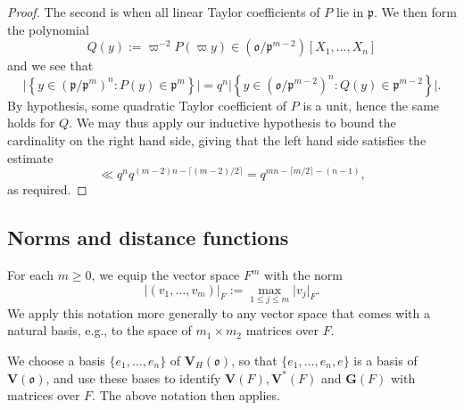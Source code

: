 \documentclass[reqno]{amsart}
\theoremstyle{plain} \newtheorem{theorem} {Theorem} \newtheorem{conjecture} {Conjecture} \newtheorem{corollary} [theorem] {Corollary} \newtheorem{proposition} [theorem] {Proposition} \newtheorem{fact} [theorem] {Fact}
\theoremstyle{definition} \newtheorem{definition} [theorem] {Definition}
\theoremstyle{itplain} %
\begin{document}
\begin{proof}
  The second is when all linear Taylor coefficients of $P$ lie in $\mathfrak{p}$.  We then form the polynomial
  \begin{equation*}
    Q(y) := \varpi^{-2} P(\varpi y) \in (\mathfrak{o} / \mathfrak{p}^{m-2})[X_1,\dotsc,X_n]
  \end{equation*}
  and we see that
  \begin{equation*}
    \lvert \left\{ y \in {(\mathfrak{p}/\mathfrak{p}^m)}^n : P(y) \in \mathfrak{p}^m \right\} \rvert
    =
    q^n \lvert \left\{ y \in {(\mathfrak{o}/\mathfrak{p}^{m-2})}^n : Q(y) \in \mathfrak{p}^{m-2} \right\} \rvert.
  \end{equation*}
  By hypothesis, some quadratic Taylor coefficient of $P$ is a unit, hence the same holds for $Q$.  We may thus apply our inductive hypothesis to bound the cardinality on the right hand side, giving that the left hand side satisfies the estimate
  \begin{equation*}
    \ll q^n q ^{(m- 2) n - \lceil (m-2)/2 \rceil}
    =
    q ^{m n - \lceil m/2 \rceil - (n-1)},
  \end{equation*}
  as required.
\end{proof}


\subsection{Norms and distance functions}\label{sec:norms-distance-functions}
For each $m \geq 0$, we equip the vector space $F^m$ with the norm
\begin{equation*}
  \left\lvert  (v_1,\dotsc,v_m)  \right\rvert_F := \max_{1 \leq j \leq m} \lvert v _j  \rvert_F.
\end{equation*}
We apply this notation more generally to any vector space that comes with a natural basis, e.g., to the space of $m_1 \times m_2$ matrices over $F$.


We choose a basis $\{e_1,\dotsc,e_n\}$ of $\mathbf{V}_H(\mathfrak{o})$, so that $\{e_1,\dotsc,e_n,e\}$ is a basis of $\mathbf{V}(\mathfrak{o})$, and use these bases to identify $\mathbf{V}(F), \mathbf{V}^*(F)$ and $\mathbf{G}(F)$ with matrices over $F$.  The above notation then applies.
\end{document}
